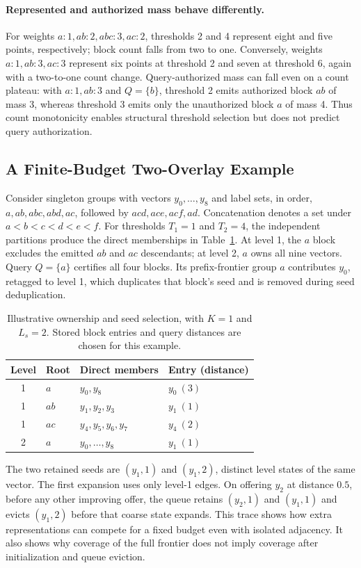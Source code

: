 \paragraph{Represented and authorized mass behave differently.}
For weights $a:1,ab:2,abc:3,ac:2$, thresholds 2 and 4 represent eight and
five points, respectively; block count falls from two to one. Conversely,
weights $a:1,ab:3,ac:3$ represent six points at threshold 2 and seven at
threshold 6, again with a two-to-one count change. Query-authorized mass can
fall even on a count plateau: with $a:1,ab:3$ and $Q=\{b\}$, threshold 2
emits authorized block $ab$ of mass 3, whereas threshold 3 emits only the
unauthorized block $a$ of mass 4. Thus count monotonicity enables structural
threshold selection but does not predict query authorization.

\subsection{A Finite-Budget Two-Overlay Example}
\label{sec:finite-budget-example}
Consider singleton groups with vectors $y_0,\ldots,y_8$ and label sets,
in order, $a,ab,abc,abd,ac$, followed by $acd,ace,acf,ad$.
Concatenation denotes a set under $a<b<c<d<e<f$. For thresholds $T_1=1$ and $T_2=4$, the independent
partitions produce the direct memberships in Table~\ref{tab:seed-trace}.
At level 1, the $a$ block excludes the emitted $ab$ and $ac$ descendants;
at level 2, $a$ owns all nine vectors. Query $Q=\{a\}$ certifies all four
blocks. Its prefix-frontier group $a$ contributes $y_0$, retagged to level 1,
which duplicates that block's seed and is removed during seed deduplication.

\begin{table}[H]
\centering\small
\caption{Illustrative ownership and seed selection, with $K=1$ and $L_s=2$.
Stored block entries and query distances are chosen for this example.}
\label{tab:seed-trace}
\begin{tabular}{clll}
\toprule
Level & Root & Direct members & Entry (distance)\\
\midrule
1 & $a$ & $y_0,y_8$ & $y_0\ (3)$\\
1 & $ab$ & $y_1,y_2,y_3$ & $y_1\ (1)$\\
1 & $ac$ & $y_4,y_5,y_6,y_7$ & $y_4\ (2)$\\
2 & $a$ & $y_0,\ldots,y_8$ & $y_1\ (1)$\\
\bottomrule
\end{tabular}
\end{table}

The two retained seeds are $(y_1,1)$ and $(y_1,2)$, distinct level states of
the same vector. The first expansion uses only level-1 edges. On offering
$y_2$ at distance $0.5$, before any other improving offer, the queue retains
$(y_2,1)$ and $(y_1,1)$ and evicts
$(y_1,2)$ before that coarse state expands. This trace shows how extra
representations can compete for a fixed budget even with isolated adjacency.
It also shows why coverage of the full frontier does not imply coverage
after initialization and queue eviction.
